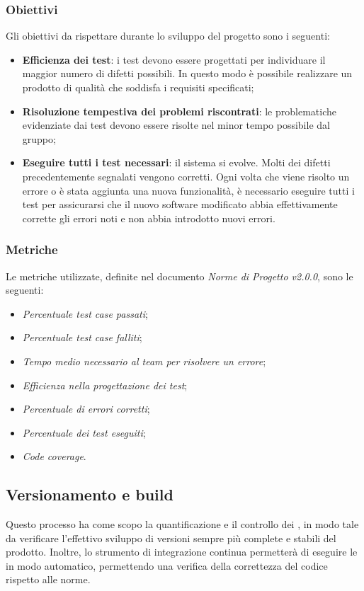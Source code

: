\subsubsection{Obiettivi} 
Gli obiettivi da rispettare durante lo sviluppo del progetto sono i seguenti:
\begin{itemize}
	\item{\textbf{Efficienza dei test}: i test devono essere progettati per individuare il maggior numero di difetti possibili. In questo modo è possibile realizzare un prodotto di qualità che soddisfa i requisiti specificati;}
	\item{\textbf{Risoluzione tempestiva dei problemi riscontrati}: le problematiche evidenziate dai test devono essere risolte nel minor tempo possibile dal gruppo;}
	\item{\textbf{Eseguire tutti i test necessari}: il sistema si evolve. Molti dei difetti precedentemente segnalati vengono corretti. Ogni volta che viene risolto un errore o è stata aggiunta una nuova funzionalità, è necessario eseguire tutti i test per assicurarsi che il nuovo software modificato abbia effettivamente corrette gli errori noti e non abbia introdotto nuovi errori.}
\end{itemize}
\subsubsection{Metriche}
Le metriche utilizzate, definite nel documento \emph{Norme di Progetto v2.0.0}, sono le seguenti:
\begin{itemize}
	\item{\emph{Percentuale test case passati};}
	\item{\emph{Percentuale test case falliti};}
	\item{\emph{Tempo medio necessario al team per risolvere un errore};}
	\item{\emph{Efficienza nella progettazione dei test};}
	\item{\emph{Percentuale di errori corretti};}
	\item{\emph{Percentuale dei test eseguiti};}
	\item{\emph{Code coverage}.}

\end{itemize}

\subsection{Versionamento e build} 
Questo processo ha come scopo la quantificazione e il controllo dei , in modo tale da verificare l'effettivo sviluppo di versioni sempre più complete e stabili del prodotto. Inoltre, lo strumento di integrazione continua  permetterà di eseguire le  in modo automatico, permettendo una verifica della correttezza del codice rispetto alle norme.
